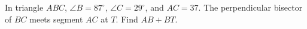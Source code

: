 In triangle $ABC$, $\angle B=87^\circ$, $\angle C=29^\circ$, and $AC=37$. The perpendicular bisector of $BC$ meets segment $AC$ at $T$. Find $AB+BT$.
